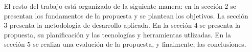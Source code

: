 El resto del trabajo está organizado de la siguiente manera: en la sección 2 se presentan los fundamentos de la propuesta y se plantean los 
objetivos. La sección 3 presenta la metodología de desarrollo aplicada. En la sección 4 se presenta la propuesta, su planificación y 
las tecnologías y herramientas utlizadas. En la sección 5 se realiza una evalución de la propuesta, y finalmente, las conclusiones.